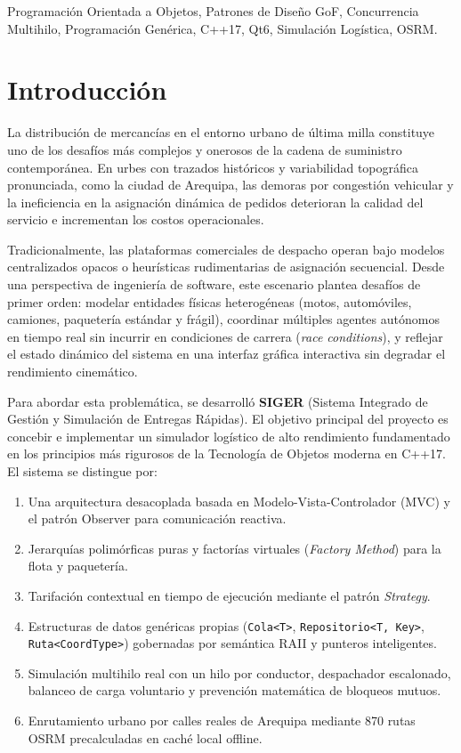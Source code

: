 \documentclass[conference]{IEEEtran}
\begin{document}
\begin{IEEEkeywords}
Programación Orientada a Objetos, Patrones de Diseño GoF, Concurrencia Multihilo, Programación Genérica, C++17, Qt6, Simulación Logística, OSRM.
\end{IEEEkeywords}

\section{Introducción}
La distribución de mercancías en el entorno urbano de última milla constituye uno de los desafíos más complejos y onerosos de la cadena de suministro contemporánea. En urbes con trazados históricos y variabilidad topográfica pronunciada, como la ciudad de Arequipa, las demoras por congestión vehicular y la ineficiencia en la asignación dinámica de pedidos deterioran la calidad del servicio e incrementan los costos operacionales.

Tradicionalmente, las plataformas comerciales de despacho operan bajo modelos centralizados opacos o heurísticas rudimentarias de asignación secuencial. Desde una perspectiva de ingeniería de software, este escenario plantea desafíos de primer orden: modelar entidades físicas heterogéneas (motos, automóviles, camiones, paquetería estándar y frágil), coordinar múltiples agentes autónomos en tiempo real sin incurrir en condiciones de carrera (\textit{race conditions}), y reflejar el estado dinámico del sistema en una interfaz gráfica interactiva sin degradar el rendimiento cinemático.

Para abordar esta problemática, se desarrolló \textbf{SIGER} (Sistema Integrado de Gestión y Simulación de Entregas Rápidas). El objetivo principal del proyecto es concebir e implementar un simulador logístico de alto rendimiento fundamentado en los principios más rigurosos de la Tecnología de Objetos moderna en C++17. El sistema se distingue por:
\begin{enumerate}
    \item Una arquitectura desacoplada basada en Modelo-Vista-Controlador (MVC) y el patrón Observer para comunicación reactiva.
    \item Jerarquías polimórficas puras y factorías virtuales (\textit{Factory Method}) para la flota y paquetería.
    \item Tarifación contextual en tiempo de ejecución mediante el patrón \textit{Strategy}.
    \item Estructuras de datos genéricas propias (\texttt{Cola<T>}, \texttt{Repositorio<T, Key>}, \texttt{Ruta<CoordType>}) gobernadas por semántica RAII y punteros inteligentes.
    \item Simulación multihilo real con un hilo por conductor, despachador escalonado, balanceo de carga voluntario y prevención matemática de bloqueos mutuos.
    \item Enrutamiento urbano por calles reales de Arequipa mediante 870 rutas OSRM precalculadas en caché local offline.
\end{enumerate}
\end{document}
